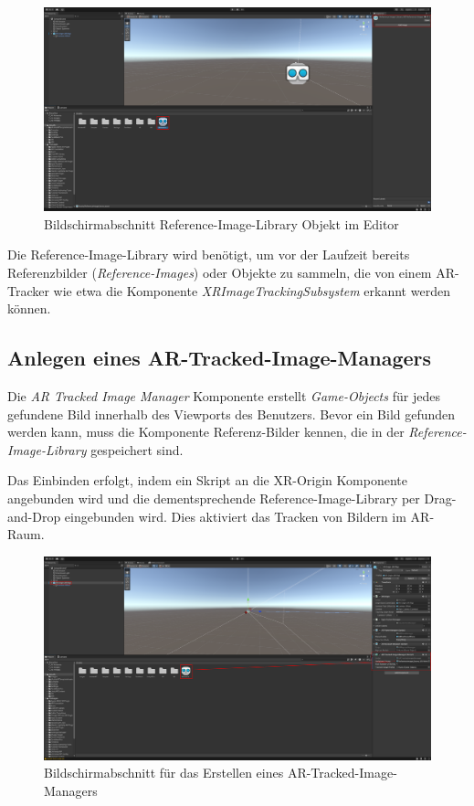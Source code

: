 \begin{figure}[H]
    \centering
    \includegraphics[width=\textwidth]{images/PrAr_UnityAR-See-Img-lib.png}
    \caption{Bildschirmabschnitt Reference-Image-Library Objekt im Editor}
    \label{fig:implementierung:unity:AR-See-Img-Lib}
\end{figure}

Die Reference-Image-Library wird benötigt, um vor der Laufzeit bereits Referenzbilder (\textit{Reference-Images}) oder Objekte zu sammeln, die von einem AR-Tracker wie etwa die Komponente \textit{XRImageTrackingSubsystem} erkannt werden können.

\subsection{Anlegen eines AR-Tracked-Image-Managers}

Die \textit{AR Tracked Image Manager} Komponente erstellt \textit{Game-Objects} für jedes gefundene Bild innerhalb des Viewports des Benutzers. Bevor ein Bild gefunden werden kann, muss die Komponente Referenz-Bilder kennen, die in der \textit{Reference-Image-Library} gespeichert sind.

Das Einbinden erfolgt, indem ein Skript an die XR-Origin Komponente angebunden wird und die dementsprechende Reference-Image-Library per Drag-and-Drop eingebunden wird. Dies aktiviert das Tracken von Bildern im AR-Raum.

\begin{figure}[H]
    \centering
    \includegraphics[width=\textwidth]{images/PrAr_UnityAR-Create-Img-Mngr.png}
    \caption{Bildschirmabschnitt für das Erstellen eines AR-Tracked-Image-Managers}
    \label{fig:implementierung:unity:AR-Create-Img-Mngr}
\end{figure}

